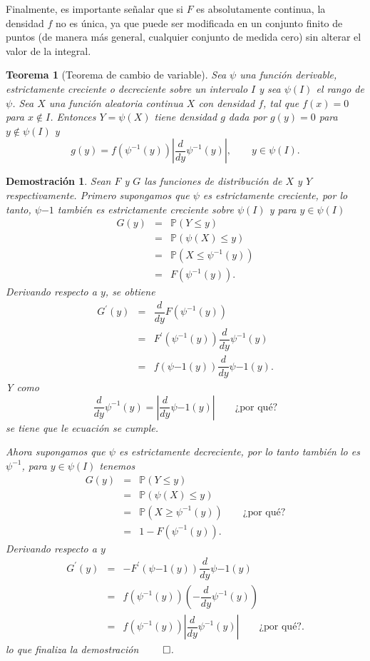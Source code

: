 \documentclass[11pt]{report}
\theoremstyle{break}
\newtheorem{teorema}{Teorema}[chapter]
\newtheorem*{demostracion}{Demostración}
\theoremstyle{break}
\begin{document}
Finalmente, es importante señalar que si $F$ es absolutamente continua, la densidad $f$ no es única, ya que puede ser modificada en un conjunto finito de puntos (de manera más general, cualquier conjunto de medida cero) sin alterar el valor de la integral.

\begin{teorema}[Teorema de cambio de variable]
\label{teorema:cambio de variable}
Sea $\psi$ una función derivable, estrictamente creciente o decreciente sobre un intervalo $I$ y sea $\psi(I)$ el rango de $\psi$. Sea $X$ una función aleatoria continua $X$ con densidad $f$, tal que $f(x) = 0$ para $x \notin I$. Entonces $Y = \psi(X)$ tiene densidad $g$ dada por $g(y) = 0$ para $y \notin \psi(I)$ y 
$$
g(y) = f(\psi^{-1}(y)) \left| \dfrac{d}{dy}\psi^{-1}(y)\right|, \qquad y \in \psi(I).
$$
\end{teorema}

\begin{demostracion}
Sean $F$ y $G$ las funciones de distribución de $X$ y $Y$ respectivamente. Primero supongamos que $\psi$ es estrictamente creciente, por lo tanto, $\psi{-1}$ también es estrictamente creciente sobre $\psi(I)$ y para $y \in \psi(I)$
$$
\begin{array}{lll}
G(y) & = & \mathbb{P}(Y \leq y)\\
 & = & \mathbb{P}(\psi(X) \leq y) \\
 & = & \mathbb{P}(X \leq \psi^{-1}(y))\\
 & = & F(\psi^{-1}(y)).
\end{array}
$$
Derivando respecto a $y$, se obtiene
$$
\begin{array}{lll}
G^{'}(y) & = & \dfrac{d}{dy}F(\psi^{-1}(y))\\
& = & F^{'}(\psi^{-1}(y))\dfrac{d}{dy}\psi^{-1}(y)\\
& = & f(\psi{-1}(y))\dfrac{d}{dy}\psi{-1}(y).
\end{array}
$$
Y como
$$
\dfrac{d}{dy}\psi^{-1}(y) = \left| \dfrac{d}{dy}\psi{-1}(y) \right| \qquad \mbox{¿por qué?}
$$
se tiene que le ecuación se cumple.

Ahora supongamos que $\psi$ es estrictamente decreciente, por lo tanto también lo es $\psi^{-1}$, para $y \in \psi(I)$ tenemos
$$
\begin{array}{lcl}
G(y) & = & \mathbb{P}(Y \leq y) \\
& = & \mathbb{P}(\psi(X) \leq y) \\
& = & \mathbb{P}(X \geq \psi^{-1}(y)) \qquad \mbox{¿por qué?} \\
& = & 1 - F(\psi^{-1}(y)).
\end{array}
$$
Derivando respecto a $y$
$$
\begin{array}{lcl}
G^{'}(y) & = & -F^{'}(\psi{-1}(y))\dfrac{d}{dy}\psi{-1}(y)\\
& = & f(\psi^{-1}(y))\left( - \dfrac{d}{dy} \psi^{-1}(y)  \right) \\
 & = & f(\psi^{-1}(y))\left| \dfrac{d}{dy} \psi^{-1}(y)  \right| \qquad \mbox{¿por qué?}. 
\end{array}
$$
lo que finaliza la demostración $\qed$.
\end{demostracion}
\end{document}

